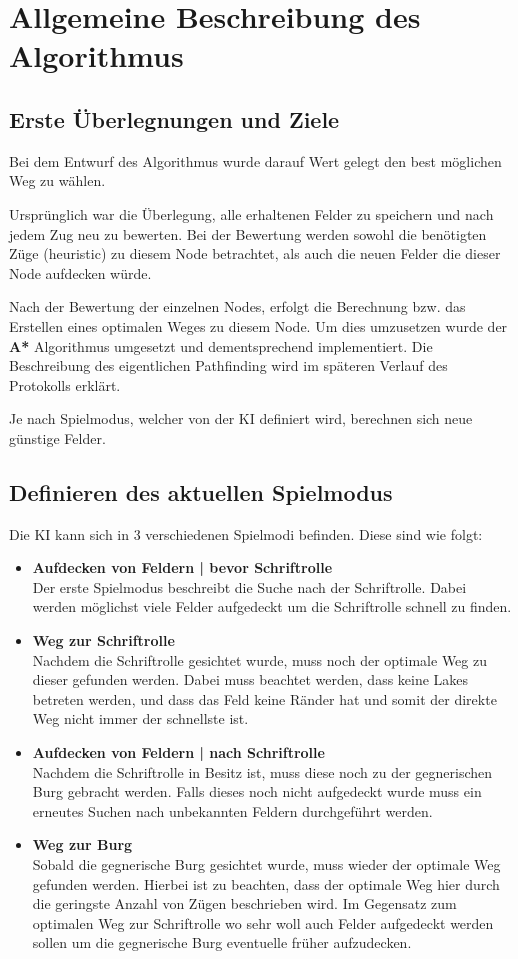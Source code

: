 \section{Allgemeine Beschreibung des Algorithmus}
\subsection{Erste Überlegnungen und Ziele}
Bei dem Entwurf des Algorithmus wurde darauf Wert gelegt den best möglichen Weg zu wählen.

Ursprünglich war die Überlegung, alle erhaltenen Felder zu speichern und nach jedem Zug neu zu bewerten. Bei der Bewertung werden sowohl die benötigten Züge (heuristic) zu diesem Node betrachtet, als auch die neuen Felder die dieser Node aufdecken würde.

Nach der Bewertung der einzelnen Nodes, erfolgt die Berechnung bzw. das Erstellen eines optimalen Weges zu diesem Node.
Um dies umzusetzen wurde der \textbf{A*} Algorithmus umgesetzt und dementsprechend implementiert. Die Beschreibung des eigentlichen Pathfinding wird im späteren Verlauf des Protokolls erklärt. 

Je nach Spielmodus, welcher von der KI definiert wird, berechnen sich neue günstige Felder.

\subsection{Definieren des aktuellen Spielmodus}
Die KI kann sich in 3 verschiedenen Spielmodi befinden.
Diese sind wie folgt:
\begin{itemize}
	\item \textbf{Aufdecken von Feldern | bevor Schriftrolle}\\
	Der erste Spielmodus beschreibt die Suche nach der Schriftrolle. Dabei werden möglichst viele Felder aufgedeckt um die Schriftrolle schnell zu finden.
	
	\item \textbf{Weg zur Schriftrolle}\\
	Nachdem die Schriftrolle gesichtet wurde, muss noch der optimale Weg zu dieser gefunden werden. Dabei muss beachtet werden, dass keine Lakes betreten werden, und dass das Feld keine Ränder hat und somit der direkte Weg nicht immer der schnellste ist.
	
	\item \textbf{Aufdecken von Feldern | nach Schriftrolle}\\
	Nachdem die Schriftrolle in Besitz ist, muss diese noch zu der gegnerischen Burg gebracht werden. Falls dieses noch nicht aufgedeckt wurde muss ein erneutes Suchen nach unbekannten Feldern durchgeführt werden.
	
	\item \textbf{Weg zur Burg}\\
	Sobald die gegnerische Burg gesichtet wurde, muss wieder der optimale Weg gefunden werden.
	Hierbei ist zu beachten, dass der optimale Weg hier durch die geringste Anzahl von Zügen beschrieben wird. Im Gegensatz zum optimalen Weg zur Schriftrolle wo sehr woll auch Felder aufgedeckt werden sollen um die gegnerische Burg eventuelle früher aufzudecken.
\end{itemize}

